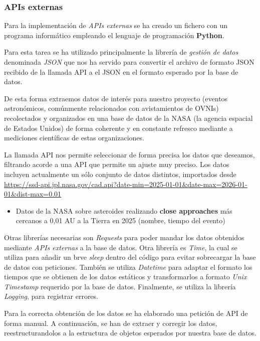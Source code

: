 \subsubsection{APIs externas}

Para la implementación de \textit{APIs externas} se ha creado un fichero con un programa informático empleando el lenguaje de programación \textbf{Python}.

Para esta tarea se ha utilizado principalmente la librería de \textit{gestión de datos} denominada \textit{JSON} 
que nos ha servido para convertir el archivo de formato JSON recibido de la llamada API a el JSON en el formato esperado por la base de datos.

De esta forma extraemos datos de interés para nuestro proyecto (eventos astronómicos, comúnmente relacionados con avistamientos de OVNIs) 
recolectados y organizados en una base de datos de la NASA (la agencia espacial de Estados Unidos) de forma coherente y en constante refresco 
mediante a mediciones científicas de estas organizaciones.

La llamada API nos permite seleccionar de forma precisa los datos que deseamos, filtrando acorde a una API que permite un ajuste muy preciso.
Los datos incluyen actualmente un sólo conjunto de datos distintos, importados desde \url{https://ssd-api.jpl.nasa.gov/cad.api?date-min=2025-01-01&date-max=2026-01-01&dist-max=0.01}

\begin{itemize}
    \item Datos de la NASA sobre asteroides realizando \textbf{close approaches} más cercanos a 0,01 AU a la Tierra en 2025 (nombre, tiempo del evento)
\end{itemize}


Otras librerías necesarias son \textit{Requests} para poder mandar los datos obtenidos mediante \textit{APIs externas} a la base de datos. 
Otra librería es \textit{Time}, la cual se utiliza para añadir un brve \textit{sleep} dentro del código para evitar sobrecargar la base de datos con peticiones.
También se utiliza \textit{Datetime} para adaptar el formato los tiempos que se obtienen de los datos estáticos y transformarlos a formato \textit{Unix Timestamp} requerido por la base de datos. 
Finalmente, se utiliza la librería \textit{Logging}, para registrar errores.

Para la correcta obtención de los datos se ha elaborado una petición de API de forma manual. 
A continuación, se han de extraer y corregir los datos, reestructurandolos a la estructura de objetos esperados por nuestra base de datos. 

